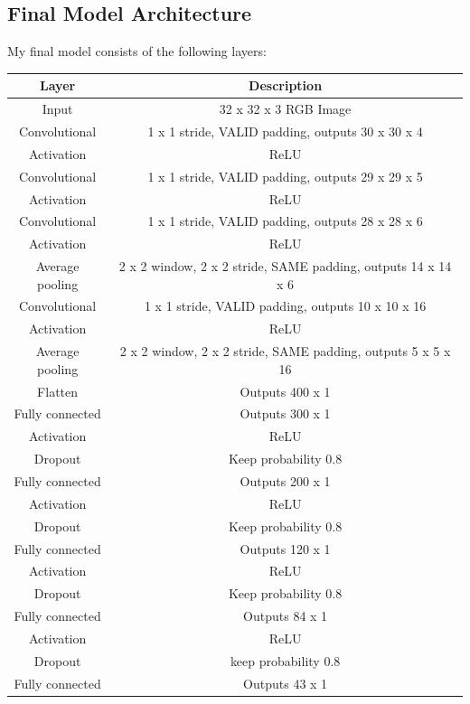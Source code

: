 \documentclass[12pt]{article}
\begin{document}
\subsection{Final Model Architecture}
My final model consists of the following layers:
\begin{center}
\begin{tabular}{|c|c|}
\hline
\textbf{Layer} & \textbf{Description} \\
\hline
Input & 32 x 32 x 3 RGB Image \\
\hline
Convolutional & 1 x 1 stride, VALID padding, outputs 30 x 30 x 4 \\
\hline
Activation & ReLU \\
\hline
Convolutional & 1 x 1 stride, VALID padding, outputs 29 x 29 x 5 \\
\hline
Activation & ReLU \\
\hline
Convolutional & 1 x 1 stride, VALID padding, outputs 28 x 28 x 6 \\
\hline
Activation & ReLU \\
\hline
Average pooling & 2 x 2 window, 2 x 2 stride, SAME padding, outputs 14 x 14 x 6 \\
\hline
Convolutional & 1 x 1 stride, VALID padding, outputs 10 x 10 x 16 \\
\hline
Activation & ReLU \\
\hline
Average pooling & 2 x 2 window, 2 x 2 stride, SAME padding, outputs 5 x 5 x 16 \\
\hline
Flatten & Outputs 400 x 1 \\
\hline
Fully connected & Outputs 300 x 1\\
\hline
Activation & ReLU \\
\hline
Dropout & Keep probability 0.8 \\
\hline
Fully connected & Outputs 200 x 1\\
\hline
Activation & ReLU \\
\hline
Dropout & Keep probability 0.8 \\
\hline
Fully connected & Outputs 120 x 1\\
\hline
Activation & ReLU \\
\hline
Dropout & Keep probability 0.8 \\
\hline
Fully connected & Outputs 84 x 1 \\
\hline
Activation & ReLU \\
\hline
Dropout & keep probability 0.8 \\
\hline
Fully connected & Outputs 43 x 1 \\
\hline
\end{tabular}
\end{center}
\end{document}
